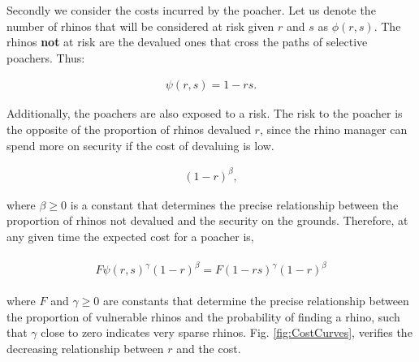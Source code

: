 \documentclass[10pt]{article}
\begin{document}
Secondly we consider the costs incurred by the poacher. Let us denote the number
of rhinos that will be considered at risk given \(r\) and \(s\) as \(\phi(r,s)\).
The rhinos \textbf{not} at risk are the devalued ones 
that cross the paths of selective poachers. Thus:

\begin{eqnarray}
	\label{eqn:psi}
	\psi(r, s) = 1 - rs.
\end{eqnarray}

Additionally, the poachers are also exposed to a risk. The risk to the poacher is
the opposite of the proportion of rhinos devalued \(r\), since the rhino manager
can spend more on security if the cost of devaluing is low.

\begin{eqnarray}
	\label{eqn:risk}
	(1 - r)^{\beta},
\end{eqnarray}

where \(\beta \geq 0\) is a constant that determines the precise relationship between
the proportion of rhinos not devalued and the security on the grounds. Therefore,
at any given time the expected cost for a poacher is, 

\begin{eqnarray}
	\label{eqn:individual_cost}
	\begin{array}{l}
	F \psi(r, s)^{\gamma} (1 - r)^{\beta} = F (1 - rs) ^{\gamma} (1 - r) ^{\beta}
	\end{array}
\end{eqnarray}

where \(F\) and \(\gamma \geq 0\) are constants that determine the precise relationship
between the proportion of vulnerable rhinos and the probability of finding a rhino,
such that \(\gamma\) close to zero indicates very sparse rhinos. Fig.
\ref{fig:CostCurves},  verifies the decreasing relationship between \(r\) and the
cost.
\end{document}
